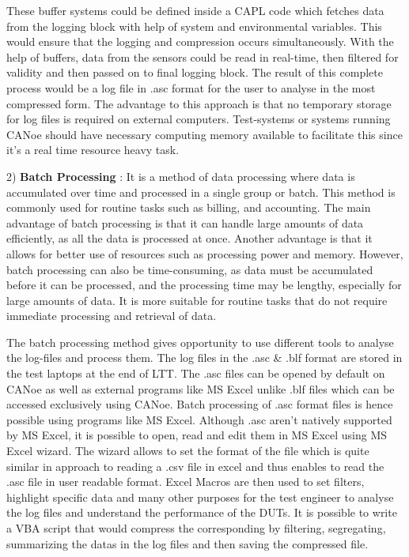 These buffer systems could be defined inside a CAPL code which fetches data from the logging block with help of system and environmental variables. This would ensure that the logging and compression occurs simultaneously. With the help of buffers, data from the sensors could be read in real-time, then filtered for validity and then passed on to final logging block. The result of this complete process would be a log file in .asc format for the user to analyse in the most compressed form. The advantage to this approach is that no temporary storage for log files is required on external computers. Test-systems or systems running CANoe should have necessary computing memory available to facilitate this since it's a real time resource heavy task.


2) \textbf{Batch Processing} : It is a method of data processing where data is accumulated over time and processed in a single group or batch. This method is commonly used for routine tasks such as billing, and accounting. The main advantage of batch processing is that it can handle large amounts of data efficiently, as all the data is processed at once. Another advantage is that it allows for better use of resources such as processing power and memory. However, batch processing can also be time-consuming, as data must be accumulated before it can be processed, and the processing time may be lengthy, especially for large amounts of data. It is more suitable for routine tasks that do not require immediate processing and retrieval of data. 

The batch processing method gives opportunity to use different tools to analyse the log-files and process them. The log files in the .asc \& .blf format are stored in the test laptops at the end of LTT. The .asc files can be opened by default on CANoe as well as external programs like MS Excel unlike .blf files which can be accessed exclusively using CANoe. Batch processing of .asc format files is hence possible using programs like MS Excel. Although .asc aren't natively supported by MS Excel, it is possible to open, read and edit them in MS Excel using MS Excel wizard. The wizard allows to set the format of the file which is quite similar in approach to reading a .csv file in excel and thus enables to read the .asc file in user readable format. Excel Macros are then used to set filters, highlight specific data and many other purposes for the test engineer to analyse the log files and understand the performance of the DUTs. It is possible to write a VBA script that would compress the corresponding by filtering, segregating, summarizing the datas in the log files and then saving the compressed file. 

